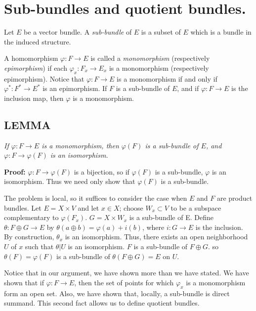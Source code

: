 
\section{Sub-bundles and quotient bundles.}\label{sec:1.3} Let $E$ be a vector bundle. A \textit{sub-bundle} of $E$ is a subset of $E$ which is a bundle in the induced structure. \par 

A homomorphism $\varphi: F \to E$ is called a \textit{monomorphism} (respectively \textit{epimorphism}) if each $\varphi_x: F_x \to E_x$ is a monomorphism (respectively epimorphism). Notice that $\varphi: F \to E$ is a monomorphism if and only if $\varphi^*: F^* \to E^*$ is an epimorphism. If $F$ is a sub-bundle of $E$, and if $\varphi: F \to E$ is the inclusion map, then $\varphi$ is a monomorphism. \par 

\subsection{LEMMA}\label{lem:1.3.1} \textit{ If $\varphi: F \to E$ is a monomorphism, then $\varphi(F)$ is a sub-bundle of $E$, and $\varphi: F \to \varphi(F)$ is an isomorphism.} \par 

\textbf{Proof:} $\varphi: F \to \varphi(F)$ is a bijection, so if $\varphi(F)$ is a sub-bundle, $\varphi$ is an isomorphism. Thus we need only show that $\varphi(F)$ is a sub-bundle. \par 

The problem is local, so it suffices to consider the case when $E$ and $F$ are product bundles. Let $E = X \times V$ and let $x \in X$; choose $W_x \subset V$ to be a subspace complementary to $\varphi(F_x)$. $G = X \times W_x$ is a sub-bundle of E. Define $\theta: F \oplus G \to E$ by $\theta(a \oplus b) = \varphi(a) + i(b)$, where $i: G \to E$ is the inclusion. By construction, $\theta_x$ is an isomorphism. Thus, there exists an open neighborhood $U$ of $x$ such that $\theta \vert U$ is an isomorphism. $F$ is a sub-bundle of $F \oplus G$. so $\theta(F) = \varphi(F)$ is a sub-bundle of $\theta(F \oplus G) = E$ on $U$. \par 

Notice that in our argument, we have shown more than we have stated. We have shown that if $\varphi: F \to E$, then the set of points for which $\varphi_x$ is a monomorphism form an open set. Also, we have shown that, locally, a sub-bundle is direct summand. This second fact allows us to define quotient bundles. \par 

